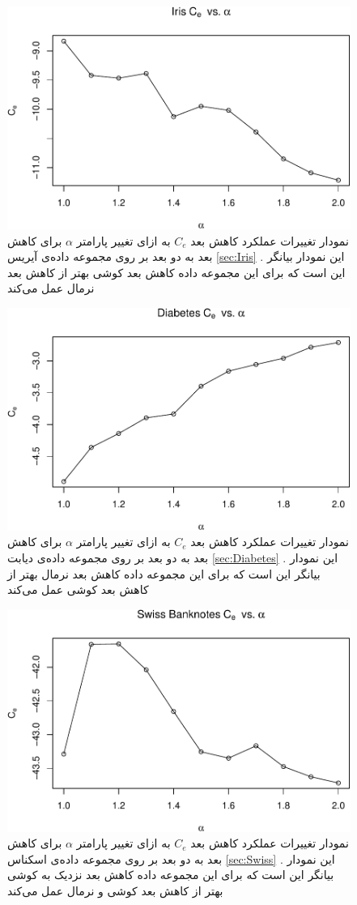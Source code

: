 \begin{figure}[H]
\centering
\includegraphics[width=0.7\linewidth]{Report_files/figure-latex/unnamed-chunk-20-2}
\caption{
نمودار تغییرات عملکرد کاهش بعد 
$C_e$
به ازای تغییر پارامتر
$\alpha$
برای کاهش بعد به 
دو
 بعد بر روی مجموعه داده‌‌‌ی 
آیریس
\ref{sec:Iris}
. این نمودار بیانگر این است که برای این مجموعه داده کاهش بعد 
کوشی 
بهتر از کاهش بعد 
نرمال
عمل می‌کند
}
\end{figure}

\begin{figure}[H]
\centering
\includegraphics[width=0.7\linewidth]{Report_files/figure-latex/unnamed-chunk-20-3}
\caption{
نمودار تغییرات عملکرد کاهش بعد 
$C_e$
به ازای تغییر پارامتر
$\alpha$
برای کاهش بعد به 
دو
 بعد بر روی مجموعه داده‌‌‌ی 
دیابت
\ref{sec:Diabetes}
. این نمودار بیانگر این است که برای این مجموعه داده کاهش بعد 
نرمال
بهتر از کاهش بعد 
کوشی 
عمل می‌کند
}
\end{figure}

\begin{figure}[H]
\centering
\includegraphics[width=0.7\linewidth]{Report_files/figure-latex/unnamed-chunk-20-4}
\caption{
نمودار تغییرات عملکرد کاهش بعد 
$C_e$
به ازای تغییر پارامتر
$\alpha$
برای کاهش بعد به 
دو
بعد بر روی مجموعه داده‌‌‌ی 
اسکناس
\ref{sec:Swiss}
. این نمودار بیانگر این است که برای این مجموعه داده کاهش بعد 
نزدیک به 
کوشی 
بهتر از کاهش بعد 
کوشی و نرمال
عمل می‌کند
}
\end{figure}

